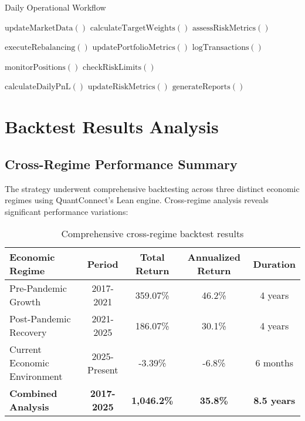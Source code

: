 \documentclass[onecolumn,ieee]{arithmaxresearch}
\begin{document}
\begin{algorithm}
\caption{Daily Operational Workflow}
\label{alg:operational}
\begin{algorithmic}[1]
    \State $\text{updateMarketData}()$ 
    \State $\text{calculateTargetWeights}()$
    \State $\text{assessRiskMetrics}()$
    
     
        \State $\text{executeRebalancing}()$
        \State $\text{updatePortfolioMetrics}()$
        \State $\text{logTransactions}()$
    \EndIf
    
    \State $\text{monitorPositions}()$ 
    \State $\text{checkRiskLimits}()$
    
    \State $\text{calculateDailyPnL}()$ 
    \State $\text{updateRiskMetrics}()$
    \State $\text{generateReports}()$
\EndFunction
\end{algorithmic}
\end{algorithm}

\section{Backtest Results Analysis}

\subsection{Cross-Regime Performance Summary}

The strategy underwent comprehensive backtesting across three distinct economic regimes using QuantConnect's Lean engine. Cross-regime analysis reveals significant performance variations:

\begin{table}[h]
\centering
\begin{tabular}{lcccc}
\toprule
\textbf{Economic Regime} & \textbf{Period} & \textbf{Total Return} & \textbf{Annualized Return} & \textbf{Duration} \\
\midrule
Pre-Pandemic Growth & 2017-2021 & 359.07\% & 46.2\% & 4 years \\
Post-Pandemic Recovery & 2021-2025 & 186.07\% & 30.1\% & 4 years \\
Current Economic Environment & 2025-Present & -3.39\% & -6.8\% & 6 months \\
\midrule
\textbf{Combined Analysis} & \textbf{2017-2025} & \textbf{1,046.2\%} & \textbf{35.8\%} & \textbf{8.5 years} \\
\bottomrule
\end{tabular}
\caption{Comprehensive cross-regime backtest results}
\end{table}
\end{document}
